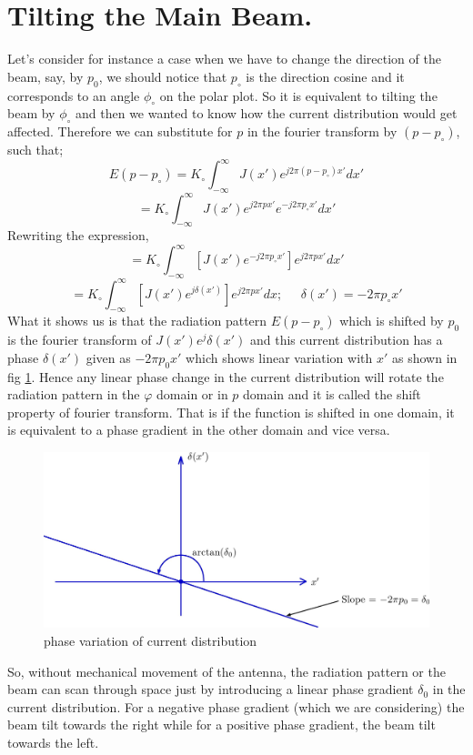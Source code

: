 \section{Tilting the Main Beam.}
Let's consider for instance a case when we have to change the direction of the beam, say, by $p_0$, we should notice that $p_\circ$ is the direction cosine and it corresponds to an angle $\phi_\circ$ on the polar plot. So it is equivalent to tilting the beam by $\phi_\circ$ and then we wanted to know how the current distribution would get affected. Therefore we can substitute for $p$ in the fourier transform by $(p - p_\circ)$, such that;
$$E(p - p_\circ) = K_\circ\int_{-\infty}^{\infty} J(x') e^{j2\pi (p - p_\circ)x'} dx'$$
$$= K_\circ\int_{-\infty}^{\infty} J(x') e^{j2\pi px'}  e^{-j2\pi p_\circ x'} dx'$$
Rewriting the expression,
$$= K_\circ\int_{-\infty}^{\infty} [J(x') e^{-j2\pi p_\circ x'}] e^{j2\pi px'} dx'$$
$$ = K_\circ\int_{-\infty}^{\infty} [J(x') e^{j\delta (x')}] e^{j2\pi px'} dx ;\; \; \; \; \; \delta(x') = -2\pi p_\circ x'$$
What it shows us is that the radiation pattern $E(p - p_\circ)$ which is shifted by $p_0$ is the fourier transform of  $J(x')e^j\delta(x')$ and this current distribution has a phase $\delta(x')$ given as $-2\pi p_0x'$ which shows linear variation with $x'$ as shown in fig \ref{fig11}. Hence any linear phase change in the current distribution will rotate the radiation pattern in the $\varphi$ domain or in $p$ domain and it is called the shift property of fourier transform. That is if the function is shifted in one domain, it is equivalent to a phase gradient in the other domain and vice versa.
\begin{figure}[h]
\centering
\includegraphics[width=1\linewidth]{./graphics/n11}
\caption{phase variation of current distribution}
\label{fig11}
\end{figure}

So, without mechanical movement of the antenna, the radiation pattern or the beam can scan through space just by introducing a linear phase gradient $\delta_0$ in the current distribution. For a negative phase gradient (which we are considering) the beam tilt towards the right while for a positive phase gradient, the beam tilt towards the left.


